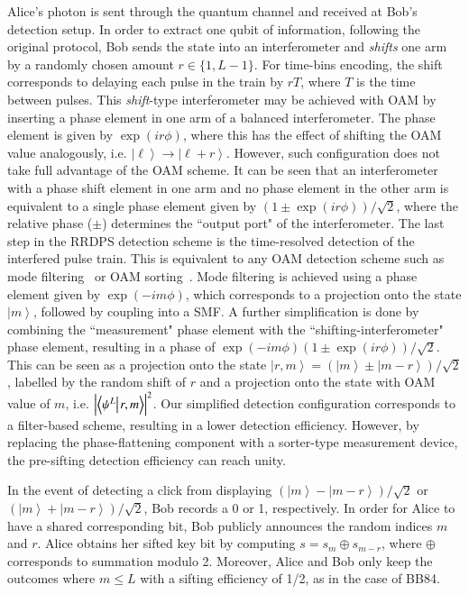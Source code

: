 \documentclass[twocolumn,aps,prl,floatfix,superscriptaddress]{revtex4-1}
\newcommand{\ket}[1]{\left| #1 \right\rangle}
\newcommand{\braket}[2]{\left\langle {#1{\left| \vphantom{#1 #2} \right.} #2} \right\rangle}
\begin{document}
Alice's photon is sent through the quantum channel and received at Bob's detection setup. In order to extract one qubit of information, following the original protocol, Bob sends the state into an interferometer and \emph{shifts} one arm by a randomly chosen amount \mbox{$r\in\{1,L-1\}$}. For time-bins encoding, the shift corresponds to delaying each pulse in the train by $rT$, where $T$ is the time between pulses. This \emph{shift}-type interferometer may be achieved with OAM by inserting a phase element in one arm of a balanced interferometer. The phase element is given by $\exp (i r \phi)$, where this has the effect of shifting the OAM value analogously, i.e. $\ket{\ell} \longrightarrow \ket{\ell+r}$. However, such configuration does not take full advantage of the OAM scheme. It can be seen that an interferometer with a phase shift element in one arm and no phase element in the other arm is equivalent to a single phase element given by $(1 \pm \exp (i r \phi))/\sqrt{2}$, where the relative phase ($\pm$) determines the ``output port" of the interferometer. The last step in the RRDPS detection scheme is the time-resolved detection of the interfered pulse train. This is equivalent to any OAM detection scheme such as mode filtering~\cite{mair:01} or OAM sorting~\cite{berkhout:10}. Mode filtering is achieved using a phase element given by $\exp(- i m \phi)$, which corresponds to a projection onto the state $\ket{m}$, followed by coupling into a SMF. A further simplification is done by combining the ``measurement" phase element with the ``shifting-interferometer" phase element, resulting in a phase of $\exp(- i m \phi) ( 1\pm \exp (i r \phi))/\sqrt{2}$. This can be seen as a projection onto the state $\ket{r,m} = (\ket{m} \pm \ket{m-r} )/\sqrt{2}$, labelled by the random shift of $r$ and a projection onto the state with OAM value of $m$, i.e. $\left| \braket{\psi^L}{r,m} \right|^2$. Our simplified detection configuration corresponds to a filter-based scheme, resulting in a lower detection efficiency. However, by replacing the phase-flattening component with a sorter-type measurement device, the pre-sifting detection efficiency can reach unity. 

In the event of detecting a click from displaying $(\ket{m}- \ket{m-r} )/\sqrt{2}$ or $(\ket{m}+\ket{m-r} )/\sqrt{2}$, Bob records a 0 or 1, respectively. In order for Alice to have a shared corresponding bit, Bob publicly announces the random indices $m$ and $r$. Alice obtains her sifted key bit by computing $s=s_m \oplus s_{m-r}$, where $\oplus$ corresponds to summation modulo 2. Moreover, Alice and Bob only keep the outcomes where $m \leq L$ with a sifting efficiency of 1/2, as in the case of BB84.
\end{document}
